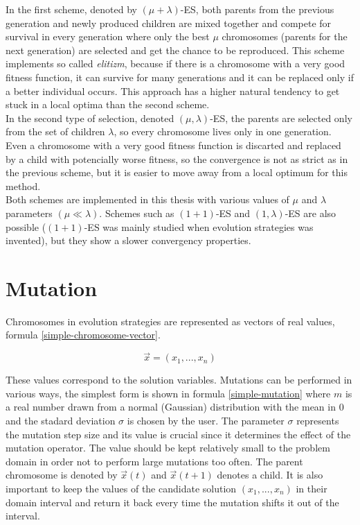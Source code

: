 In the first scheme, denoted by $(\mu + \lambda)$-ES, both parents from the previous generation and newly produced children are mixed together and compete for survival in every generation where only the best $\mu$ chromosomes (parents for the next generation) are selected and get the chance to be reproduced. This scheme implements so called \textit{elitizm}, because if there is a chromosome with a very good fitness function, it can survive for many generations and it can be replaced only if a better individual occurs. This approach has a higher natural tendency to get stuck in a local optima than the second scheme.\\
In the second type of selection, denoted $(\mu,\lambda)$-ES, the parents are selected only from the set of children $\lambda$, so every chromosome lives only in one generation. Even a chromosome with a very good fitness function is discarted and replaced by a child with potencially worse fitness, so the convergence is not as strict as in the previous scheme, but it is easier to move away from a local optimum for this method.\\
Both schemes are implemented in this thesis with various values of $\mu$ and $\lambda$ parameters $(\mu \ll \lambda)$. Schemes such as $(1 + 1)$-ES and $(1, \lambda)$-ES are also possible ($(1 + 1)$-ES was mainly studied when evolution strategies was invented), but they show a slower convergency properties.

\section{Mutation} \label{mutation-section}
Chromosomes in evolution strategies are represented as vectors of real values, formula \ref{simple-chromosome-vector}.

\begin{equation} \label{simple-chromosome-vector}
\vec{x} = (x_1,...,x_n)
 \end{equation}

 These values correspond to the solution variables. Mutations can be performed in various ways, the simplest form is shown in formula \ref{simple-mutation} where $m$ is a real number drawn from a normal (Gaussian) distribution with the mean in $0$ and the stadard deviation $\sigma$ is chosen by the user. The parameter $\sigma$ represents the mutation step size and its value is crucial since it determines the effect of the mutation operator. The value should be kept relatively small to the problem domain in order not to perform large mutations too often. The parent chromosome is denoted by $\vec{x}(t)$ and $\vec{x}(t+1)$ denotes a child. It is also important to keep the values of the candidate solution $(x_1,...,x_n)$ in their domain interval and return it back every time the mutation shifts it out of the interval.


